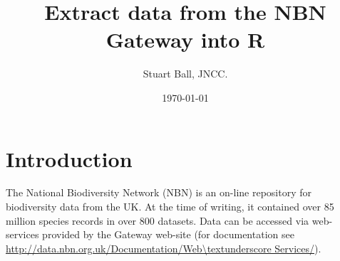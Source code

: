 \documentclass{article}
\begin{document}


\title{Extract data from the NBN Gateway into R}
\author{Stuart Ball, JNCC.}
\date\today
\maketitle
\section{Introduction}
The National Biodiversity Network (NBN) is an on-line repository for biodiversity
data from the UK. At the time of writing, it contained over 85 million species
records in over 800 datasets. Data can be accessed via web-services provided by
the Gateway web-site (for documentation see \url{http://data.nbn.org.uk/Documentation/Web\textunderscore Services/}).
\end{document}
